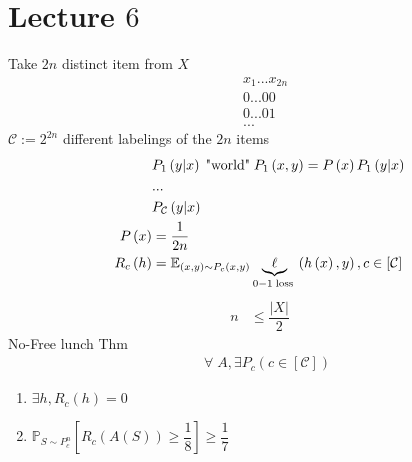 \documentclass{article}
\begin{document}
\section{Lecture $6$} 
Take $2 n$ distinct item from $X $
\begin{align*}
&x_{1} ... x_{2n}
\\ &0 ... 00
\\ &0 ... 01
\\ &...
\end{align*}
$\mathcal{C} := 2^{2n}$ different labelings of the $2 n$ items
\begin{align*}
&  P_{1}\left(y | x\right) \text{\;"world"\;} P_{1}\left(x, y\right) = P\left(x\right) P_{1}\left(y | x\right)
\\ &...
\\ &P_{\mathcal{C}}\left(y | x\right)
\\ P\left(x\right)  &= \dfrac{1}{2n}
\\ R_{c}\left(h\right) &= \mathbb{E}_{\left(x, y\right) \sim  P_{c}\left(x, y\right)} \underbrace{\ell}_{0-1 \text{\;loss\;}} \left(h\left(x\right), y\right), c \in \left[\mathcal{C}\right]
\end{align*}
\begin{align*}
n  &\leq  \dfrac{| X |}{2}
\end{align*}
No-Free lunch Thm
\begin{align*}
&\;\forall\; A, \exists P_{c} \left(c \in \left[\mathcal{C}\right]\right)
\end{align*}
\begin{enumerate}
\item $\exists h, R_{c}\left(h\right) = 0$
\item $\mathbb{P}_{S \sim  P_{c}^{n}} \left[R_{c}\left(A\left(S\right)\right) \geq  \dfrac{1}{8} \right] \geq  \dfrac{1}{7}$
\end{enumerate}
\end{document}
